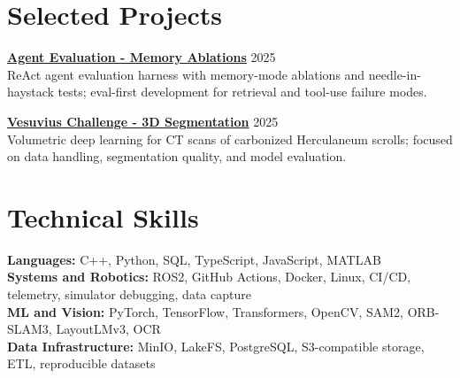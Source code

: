\documentclass[9pt,letterpaper]{article}
\newcommand{\resumeProject}[3]{
  \textbf{#1} \hfill #2\\
  #3
}
\begin{document}
\section{Selected Projects}
\resumeProject{\href{https://github.com/Jonathan-321/agentic}{Agent Evaluation - Memory Ablations}}{2025}{ReAct agent evaluation harness with memory-mode ablations and needle-in-haystack tests; eval-first development for retrieval and tool-use failure modes.}
\par\vspace{1pt}
\resumeProject{\href{https://github.com/Jonathan-321/vesuviusChallenge}{Vesuvius Challenge - 3D Segmentation}}{2025}{Volumetric deep learning for CT scans of carbonized Herculaneum scrolls; focused on data handling, segmentation quality, and model evaluation.}

\section{Technical Skills}
\textbf{Languages:} C++, Python, SQL, TypeScript, JavaScript, MATLAB\\
\textbf{Systems and Robotics:} ROS2, GitHub Actions, Docker, Linux, CI/CD, telemetry, simulator debugging, data capture\\
\textbf{ML and Vision:} PyTorch, TensorFlow, Transformers, OpenCV, SAM2, ORB-SLAM3, LayoutLMv3, OCR\\
\textbf{Data Infrastructure:} MinIO, LakeFS, PostgreSQL, S3-compatible storage, ETL, reproducible datasets
\end{document}
